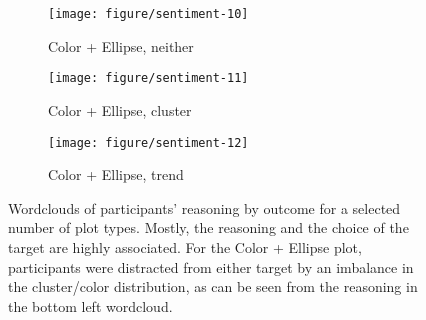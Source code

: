 \documentclass[12pt]{article}\usepackage[]{graphicx}\usepackage[]{color}
\begin{document}
\begin{figure}[h!t]
\begin{subfigure}[t]{0.275\linewidth}
  \caption{Color + Ellipse, neither}\vspace{-0.2in}
  \texttt{[image: figure/sentiment-10]}
\end{subfigure}
\begin{subfigure}[t]{0.275\linewidth}
  \caption{Color + Ellipse, cluster}\vspace{-0.2in}
  \texttt{[image: figure/sentiment-11]}
\end{subfigure}
\begin{subfigure}[t]{0.275\linewidth}
  \caption{Color + Ellipse, trend}\vspace{-0.2in}
  \texttt{[image: figure/sentiment-12]}
\end{subfigure}
\caption[Wordclouds of participant responses for selected plot types]{\label{fig:wordles}Wordclouds of participants' reasoning by outcome for a selected number of plot types. Mostly, the reasoning and the choice of the target are highly associated. For the Color + Ellipse plot, participants were distracted from either target by an imbalance in the cluster/color distribution, as can be seen from the reasoning in the bottom left wordcloud.}
\end{figure}
\end{document}

